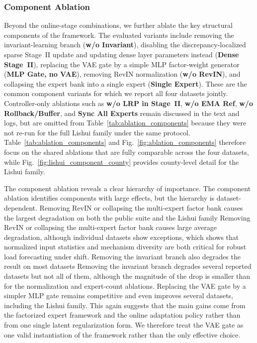 ﻿\documentclass[journal]{IEEEtran}
\DeclareRobustCommand{\oldtext}[1]{{\color{revisionred}#1}}
\DeclareRobustCommand{\newtext}[1]{{\color{revisionblue}#1}}
\DeclareRobustCommand{\why}[1]{{\color{revisionblue}{\footnotesize (#1)}}}
\DeclareRobustCommand{\rw}[3]{\oldtext{#1} \newtext{#2}\why{#3}}
\begin{document}
\subsubsection{Component Ablation}
Beyond the online-stage combinations, we further ablate the key structural components of the framework. The evaluated variants include removing the invariant-learning branch (\textbf{w/o Invariant}), disabling the discrepancy-localized sparse Stage~II update and updating dense layer parameters instead (\textbf{Dense Stage~II}), replacing the VAE gate by a simple MLP factor-weight generator (\textbf{MLP Gate, no VAE}), removing RevIN normalization (\textbf{w/o RevIN}), and collapsing the expert bank into a single expert (\textbf{Single Expert}). These are the common component variants for which we report all four datasets jointly. Controller-only ablations such as \textbf{w/o LRP in Stage~II}, \textbf{w/o EMA Ref}, \textbf{w/o Rollback/Buffer}, and \textbf{Sync All Experts} remain discussed in the text and logs, but are omitted from Table~\ref{tab:ablation_components} because they were not re-run for the full Lishui family under the same protocol. Table~\ref{tab:ablation_components} and Fig.~\ref{fig:ablation_components} therefore focus on the shared ablations that are fully comparable across the four datasets, while Fig.~\ref{fig:lishui_component_county} provides county-level detail for the Lishui family.

\rw{The component ablation reveals a clear hierarchy of importance.}{The component ablation identifies components with large effects, but the hierarchy is dataset-dependent.}{避免用 clear hierarchy 掩盖数据集例外。} \rw{Removing RevIN or collapsing the multi-expert factor bank causes the largest degradation on both the public suite and the Lishui family}{Removing RevIN or collapsing the multi-expert factor bank causes large average degradation, although individual datasets show exceptions}{与 Spain 上 w/o RevIN 数字一致。}, which shows that normalized input statistics and mechanism diversity are both critical for robust load forecasting under shift. \rw{Removing the invariant branch also degrades the result on most datasets}{Removing the invariant branch degrades several reported datasets but not all of them}{承认 Spain 列例外。}, although the magnitude of the drop is smaller than for the normalization and expert-count ablations. Replacing the VAE gate by a simpler MLP gate remains competitive and even improves several datasets, including the Lishui family. This again suggests that the main gains come from the factorized expert framework and the online adaptation policy rather than from one single latent regularization form. We therefore treat the VAE gate as one valid instantiation of the framework rather than the only effective choice.
\end{document}
